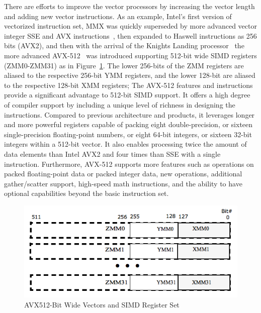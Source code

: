 \documentclass[5p,times,twocolumn]{elsarticle}
\begin{document}
There are efforts to improve the vector processors by increasing the vector
length and adding new vector instructions.
As an example, Intel's first version of vectorized instruction set, MMX was quickly superseded by more advanced vector integer SSE and AVX instructions~\cite{intelsse, intelavx, avxsets},
then expanded to Haswell instructions as 256 bits (AVX2),
and then with the arrival of the Knights Landing processor~\cite{avx-info} the more advanced
AVX-512~\cite{Intelref} was introduced supporting 512-bit wide SIMD registers (ZMM0-ZMM31)
as in Figure~\ref{fig:avxmms}. The lower 256-bits of the ZMM registers are
aliased to the respective 256-bit YMM registers, and the lower 128-bit are
aliased to the respective 128-bit XMM registers;
%
The AVX-512 features and instructions provide a significant advantage to 512-bit SIMD support.
It offers a high degree of compiler support by including a unique level of richness
in designing the instructions.
%
Compared to previous architecture and products, it leverages longer and more
powerful registers capable of packing eight double-precision, or sixteen
single-precision floating-point numbers,
or eight 64-bit integers, or sixteen 32-bit integers within a 512-bit vector.
It also enables processing twice the amount of data elements than Intel AVX2 and four
times than SSE with a single instruction.
%
Furthermore,  AVX-512 supports more features such as operations on packed
floating-point data or packed integer data, new operations, additional
gather/scatter support, high-speed math instructions, and the ability to have
optional capabilities beyond the basic instruction set.

\begin{figure}[h]
    \centering
    \includegraphics[width=\linewidth]{avx_mms.png}
    \caption{AVX512-Bit Wide Vectors and SIMD Register Set}
    \label{fig:avxmms}
\end{figure}
\end{document}
